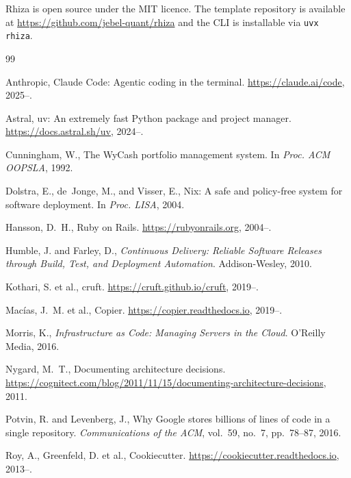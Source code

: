\documentclass[12pt,a4paper]{article}
\begin{document}
Rhiza is open source under the MIT licence. The template repository is available at \url{https://github.com/jebel-quant/rhiza} and the CLI is installable via \texttt{uvx rhiza}.


\begin{thebibliography}{99}

Anthropic, Claude Code: Agentic coding in the terminal. \url{https://claude.ai/code}, 2025--.

Astral, uv: An extremely fast Python package and project manager. \url{https://docs.astral.sh/uv}, 2024--.

Cunningham, W., The WyCash portfolio management system. In \textit{Proc. ACM OOPSLA}, 1992.

Dolstra, E., de~Jonge, M., and Visser, E., Nix: A safe and policy-free system for software deployment. In \textit{Proc. LISA}, 2004.

Hansson, D.~H., Ruby on Rails. \url{https://rubyonrails.org}, 2004--.

Humble, J. and Farley, D., \textit{Continuous Delivery: Reliable Software Releases through Build, Test, and Deployment Automation}. Addison-Wesley, 2010.

Kothari, S. et al., cruft. \url{https://cruft.github.io/cruft}, 2019--.

Macías, J.~M. et al., Copier. \url{https://copier.readthedocs.io}, 2019--.

Morris, K., \textit{Infrastructure as Code: Managing Servers in the Cloud}. O'Reilly Media, 2016.

Nygard, M.~T., Documenting architecture decisions. \url{https://cognitect.com/blog/2011/11/15/documenting-architecture-decisions}, 2011.

Potvin, R. and Levenberg, J., Why Google stores billions of lines of code in a single repository. \textit{Communications of the ACM}, vol.~59, no.~7, pp.~78--87, 2016.

Roy, A., Greenfeld, D. et al., Cookiecutter. \url{https://cookiecutter.readthedocs.io}, 2013--.

\end{thebibliography}
\end{document}
